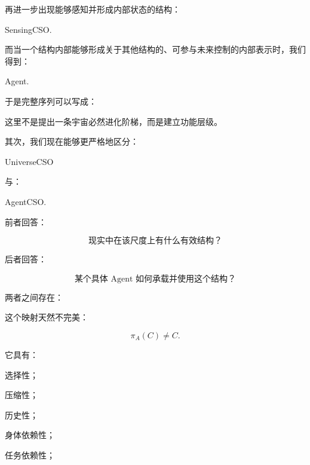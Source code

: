 再进一步出现能够感知并形成内部状态的结构：

\begin{statementbox}
SensingCSO.
\end{statementbox}

而当一个结构内部能够形成关于其他结构的、可参与未来控制的内部表示时，我们得到：

\begin{statementbox}
Agent.
\end{statementbox}

于是完整序列可以写成：

\begin{statementbox}
\centering
{}
\end{statementbox}

这里不是提出一条宇宙必然进化阶梯，而是建立功能层级。

其次，我们现在能够更严格地区分：

\begin{statementbox}
UniverseCSO
\end{statementbox}

与：

\begin{statementbox}
AgentCSO.
\end{statementbox}

前者回答：

\[
\text{现实中在该尺度上有什么有效结构？}
\]

后者回答：

\[
\text{某个具体 Agent 如何承载并使用这个结构？}
\]

两者之间存在：

\begin{statementbox}
\centering
{}
\end{statementbox}

这个映射天然不完美：

\[
\pi_A(C)
\neq
C.
\]

它具有：

选择性；

压缩性；

历史性；

身体依赖性；

任务依赖性；

